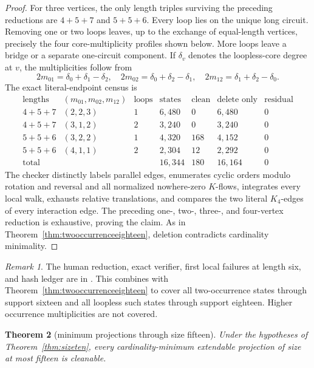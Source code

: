 \documentclass[11pt]{article}
\newtheorem{theorem}{Theorem}[section]
\theoremstyle{definition}
\theoremstyle{remark}
\newtheorem{remark}[theorem]{Remark}
\begin{document}
\begin{proof}
For three vertices, the only length triples surviving the preceding
reductions are \(4+5+7\) and \(5+5+6\).  Every loop lies on the unique
long circuit.  Removing one or two loops leaves, up to the exchange of
equal-length vertices, precisely the four core-multiplicity profiles
shown below.  More loops leave a bridge or a separate one-circuit
component.  If \(\delta_v\) denotes the loopless-core degree at \(v\),
the multiplicities follow from
\[
 2m_{01}=\delta_0+\delta_1-\delta_2,\quad
 2m_{02}=\delta_0+\delta_2-\delta_1,\quad
 2m_{12}=\delta_1+\delta_2-\delta_0 .
\]
The exact literal-endpoint census is
\[
\begin{array}{c|c|c|r|r|r|r}
\text{lengths}&(m_{01},m_{02},m_{12})&\text{loops}
 &\text{states}&\text{clean}&\text{delete only}&\text{residual}\\ \hline
4+5+7&(2,2,3)&1&6{,}480&0&6{,}480&0\\
4+5+7&(3,1,2)&2&3{,}240&0&3{,}240&0\\
5+5+6&(3,2,2)&1&4{,}320&168&4{,}152&0\\
5+5+6&(4,1,1)&2&2{,}304&12&2{,}292&0\\ \hline
\text{total}&&&16{,}344&180&16{,}164&0
\end{array}                                                \tag{26r}
\]
The checker distinctly labels parallel edges, enumerates cyclic orders
modulo rotation and reversal and all normalized nowhere-zero \(K\)-flows,
integrates every local walk, exhausts relative translations, and compares
the two literal \(K_4\)-edges of every interaction edge.  The preceding
one-, two-, three-, and four-vertex reduction is exhaustive, proving the
claim.  As in Theorem~\ref{thm:twooccurrenceeighteen}, deletion contradicts
cardinality minimality.
\end{proof}

\begin{remark}
The human reduction, exact verifier, first local failures at length six,
and hash ledger are in
.
This combines with Theorem~\ref{thm:twooccurrenceeighteen} to cover all
two-occurrence states through support sixteen and all loopless such
states through support eighteen.  Higher occurrence multiplicities are
not covered.
\end{remark}

\begin{theorem}[minimum projections through size fifteen]
\label{thm:sizefifteen}
Under the hypotheses of Theorem~\ref{thm:sizeten}, every
cardinality-minimum extendable projection of size at most fifteen is
cleanable.
\end{theorem}
\end{document}
